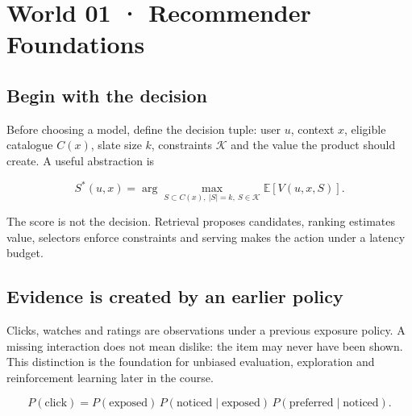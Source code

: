 \section{World 01 · Recommender Foundations}

\begin{abstract}
A recommender is a decision system for limited attention. It turns imperfect evidence about a person, a catalogue and the current context into a small ordered slate, then learns from the response.
\end{abstract}

\subsection{Begin with the decision}
Before choosing a model, define the decision tuple: user $u$, context $x$, eligible catalogue $C(x)$, slate size $k$, constraints $\mathcal{K}$ and the value the product should create. A useful abstraction is

\begin{equation*}
S^*(u,x)=\arg\max_{S\subset C(x),\ |S|=k,\ S\in\mathcal{K}}
\mathbb{E}\left[V(u,x,S)\right].
\end{equation*}

The score is not the decision. Retrieval proposes candidates, ranking estimates value, selectors enforce constraints and serving makes the action under a latency budget.


\subsection{Evidence is created by an earlier policy}
Clicks, watches and ratings are observations under a previous exposure policy. A missing interaction does not mean dislike: the item may never have been shown. This distinction is the foundation for unbiased evaluation, exploration and reinforcement learning later in the course.

\begin{equation*}
P(\text{click}) =
P(\text{exposed})\,
P(\text{noticed}\mid\text{exposed})\,
P(\text{preferred}\mid\text{noticed}).
\end{equation*}

